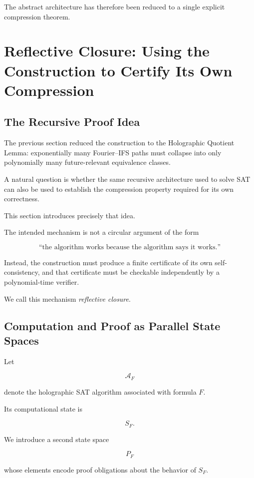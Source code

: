 \documentclass[11pt]{article}
\theoremstyle{plain}
\theoremstyle{definition}
\begin{document}
The abstract architecture has therefore been reduced to a single explicit
compression theorem.


\section{Reflective Closure: Using the Construction to Certify Its Own Compression}
\label{sec:reflective-closure}

\subsection{The Recursive Proof Idea}

The previous section reduced the construction to the Holographic Quotient
Lemma: exponentially many Fourier--IFS paths must collapse into only
polynomially many future-relevant equivalence classes.

A natural question is whether the same recursive architecture used to solve
SAT can also be used to establish the compression property required for its
own correctness.

This section introduces precisely that idea.

The intended mechanism is not a circular argument of the form

\[
    \text{``the algorithm works because the algorithm says it works.''}
\]

Instead, the construction must produce a finite certificate of its own
self-consistency, and that certificate must be checkable independently by a
polynomial-time verifier.

We call this mechanism \emph{reflective closure}.

\subsection{Computation and Proof as Parallel State Spaces}

Let

\[
    \mathcal{A}_F
\]

denote the holographic SAT algorithm associated with formula \(F\).

Its computational state is

\[
    S_F.
\]

We introduce a second state space

\[
    P_F
\]

whose elements encode proof obligations about the behavior of \(S_F\).
\end{document}
